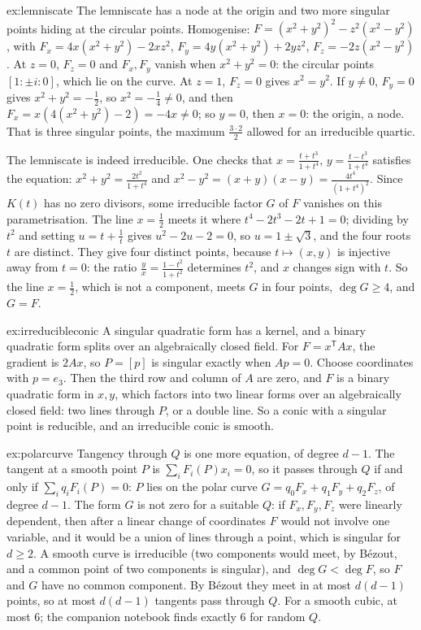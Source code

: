 \begin{solution}{ex:lemniscate}
\idea The lemniscate has a node at the origin and two more singular points hiding at the circular points.
\writeup Homogenise: $F=(x^2+y^2)^2-z^2(x^2-y^2)$, with $F_x=4x(x^2+y^2)-2xz^2$, $F_y=4y(x^2+y^2)+2yz^2$, $F_z=-2z(x^2-y^2)$. At $z=0$, $F_z=0$ and $F_x,F_y$
vanish when $x^2+y^2=0$: the circular points $[1:\pm i:0]$, which lie on the curve. At $z=1$, $F_z=0$ gives $x^2=y^2$. If $y\ne0$, $F_y=0$ gives
$x^2+y^2=-\frac12$, so $x^2=-\frac14\ne0$, and then $F_x=x(4(x^2+y^2)-2)=-4x\ne0$; so $y=0$, then $x=0$: the origin, a node. That is three singular points, the
maximum $\frac{3\cdot2}2$ allowed for an irreducible quartic.

The lemniscate is indeed irreducible. One checks that $x=\frac{t+t^3}{1+t^4}$, $y=\frac{t-t^3}{1+t^4}$ satisfies the equation: $x^2+y^2=\frac{2t^2}{1+t^4}$ and
$x^2-y^2=(x+y)(x-y)=\frac{4t^4}{(1+t^4)^2}$. Since $K(t)$ has no zero divisors, some irreducible factor $G$ of $F$ vanishes on this parametrisation. The line
$x=\frac12$ meets it where $t^4-2t^3-2t+1=0$; dividing by $t^2$ and setting $u=t+\frac1t$ gives $u^2-2u-2=0$, so $u=1\pm\sqrt3$, and the four roots $t$ are
distinct. They give four distinct points, because $t\mapsto(x,y)$ is injective away from $t=0$: the ratio $\frac yx=\frac{1-t^2}{1+t^2}$ determines $t^2$, and
$x$ changes sign with $t$. So the line $x=\frac12$, which is not a component, meets $G$ in four points, $\deg G\ge4$, and $G=F$.
\end{solution}

\begin{solution}{ex:irreducibleconic}
\idea A singular quadratic form has a kernel, and a binary quadratic form splits over an algebraically closed field.
\writeup For $F=x^{\mathsf T}Ax$, the gradient is $2Ax$, so $P=[p]$ is singular exactly when $Ap=0$. Choose coordinates with $p=e_3$. Then the third row and column of
$A$ are zero, and $F$ is a binary quadratic form in $x,y$, which factors into two linear forms over an algebraically closed field: two lines through $P$, or a
double line. So a conic with a singular point is reducible, and an irreducible conic is smooth.
\end{solution}

\begin{solution}{ex:polarcurve}
\idea Tangency through $Q$ is one more equation, of degree $d-1$.
\writeup The tangent at a smooth point $P$ is $\sum_iF_i(P)x_i=0$, so it passes through $Q$ if and only if $\sum_iq_iF_i(P)=0$: $P$ lies on the polar curve
$G=q_0F_x+q_1F_y+q_2F_z$, of degree $d-1$. The form $G$ is not zero for a suitable $Q$: if $F_x,F_y,F_z$ were linearly dependent, then after a linear change of
coordinates $F$ would not involve one variable, and it would be a union of lines through a point, which is singular for $d\ge2$. A smooth curve is irreducible
(two components would meet, by B\'ezout, and a common point of two components is singular), and $\deg G<\deg F$, so $F$ and $G$ have no common component. By
B\'ezout they meet in at most $d(d-1)$ points, so at most $d(d-1)$ tangents pass through $Q$. For a smooth cubic, at most $6$; the companion notebook finds
exactly $6$ for random $Q$.
\end{solution}

